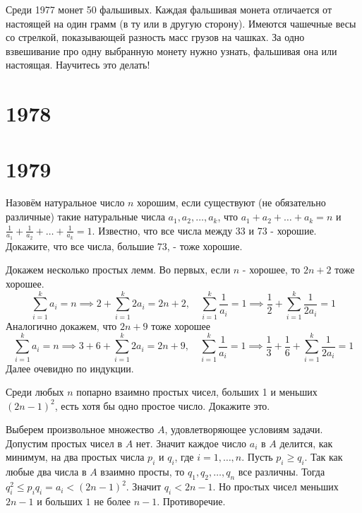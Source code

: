 \documentclass[11pt, a4paper]{template}
\begin{document}
\begin{exercise}[M466]
Среди 1977 монет 50 фальшивых. Каждая фальшивая монета отличается от настоящей на один грамм (в ту или в другую сторону). Имеются чашечные весы со стрелкой, показывающей разность масс грузов на чашках. За одно взвешивание про одну выбранную монету нужно узнать, фальшивая она или настоящая. Научитесь это делать!
\end{exercise}

\chapter{1978}

\chapter{1979}

\begin{exercise}[M554]
Назовём натуральное число $n$ хорошим, если существуют (не обязательно различные) такие натуральные числа $a_{1}, a_{2}, \dots, a_{k}$, что $a_{1} + a_{2} + \dots + a_{k} = n$ и $\frac{1}{a_{1}} + \frac{1}{a_{2}} + \dots + \frac{1}{a_{k}} = 1$. Известно, что все числа между 33 и 73 - хорошие. Докажите, что все числа, большие 73, - тоже хорошие.
\end{exercise}

\begin{solution}
Докажем несколько простых лемм. Во первых, если $n$ - хорошее, то $2n + 2$ тоже хорошее. 
$$
\sum_{i = 1}^{k} a_{i} = n \implies 2 + \sum_{i = 1}^{k} 2a_{i} = 2n + 2, \quad \sum_{i = 1}^{k} \frac{1}{a_{i}} = 1 \implies \frac{1}{2} + \sum_{i = 1}^{k} \frac{1}{2a_{i}} = 1
$$
Аналогично докажем, что $2n+9$ тоже хорошее
$$
\sum_{i = 1}^{k} a_{i} = n \implies 3 + 6 + \sum_{i = 1}^{k} 2a_{i} = 2n + 9, \quad \sum_{i = 1}^{k} \frac{1}{a_{i}} = 1 \implies \frac{1}{3} + \frac{1}{6} + \sum_{i = 1}^{k} \frac{1}{2a_{i}} = 1
$$
Далее очевидно по индукции.
\end{solution}

\begin{exercise}[M557]
Среди любых $n$ попарно взаимно простых чисел, больших 1 и меньших $(2n - 1)^{2}$, есть хотя бы одно простое число. Докажите это.
\end{exercise}

\begin{solution}
Выберем произвольное множество $A$, удовлетворяющее условиям задачи. Допустим простых чисел в $A$ нет. Значит каждое число $a_{i}$ в $A$ делится, как минимум, на два простых числа $p_{i}$ и $q_{i}$, где $i = 1, \dots, n$. Пусть $p_{i} \geqslant q_{i}$.  Так как любые два числа в $A$ взаимно просты, то $q_{1}, q_{2}, \dots, q_{n}$ все различны. Тогда $q_{i}^{2} \leqslant p_{i} q_{i} = a_{i} < (2n - 1)^{2}$. Значит $q_{i} < 2n - 1$. Но проcтых чисел меньших $2n - 1$ и больших $1$ не более $n - 1$. Противоречие.
\end{solution}
\end{document}
